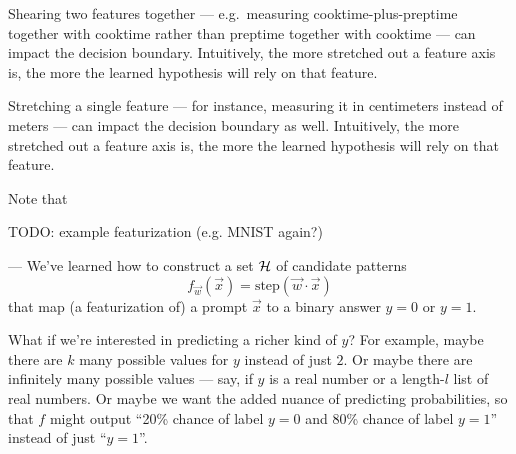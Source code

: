 \documentclass[11pt, justified]{tufte-book}
\newcommand{\attnsam}[1]{{\red \textsf{#1}}}
\newcommand{\samsubsubsection}[1]{
   \vspace{0.1cm}
   \par\noindent{\hspace{-2cm}\normalsize \sc \gre #1} ---
}
\newcommand{\sfx}{\mathsf{x}}\newcommand{\frx}{\mathcal{x}}
\newcommand{\sfy}{\mathsf{y}}\newcommand{\fry}{\mathcal{y}}
\theoremstyle{definition}
\begin{document}
        Shearing two features together --- e.g.\ measuring
        cooktime-plus-preptime together with cooktime rather than preptime
        together with cooktime --- can impact the decision boundary.
        Intuitively, the more stretched out a feature axis is, the more the
        learned hypothesis will rely on that feature.

        Stretching a single feature --- for instance, measuring it in
        centimeters instead of meters --- can impact the decision boundary
        as well.  Intuitively, the more stretched out a feature axis is, 
        the more the learned hypothesis will rely on that feature.

        Note that


        \attnsam{TODO: example featurization (e.g. MNIST again?)}


      \samsubsubsection{richer outputs}%
        We've learned how to construct a set $\mathcal{H}$ of candidate patterns 
        $$
          f_{\vec w}(\vec x) = \text{step}(\vec w\cdot \vec x) 
        $$
        that map (a featurization of) a prompt $\vec x$ to a binary answer $y=0$ or $y=1$.

        What if we're interested in predicting a richer kind of $y$?  For
        example, maybe there are $k$ many possible values for $y$ instead of
        just $2$.  Or maybe there are infinitely many possible values --- say,
        if $y$ is a real number or a length-$l$ list of real numbers.  Or maybe we want the added nuance of
        predicting probabilities, so that $f$ might output ``20\% chance of
        label $y=0$ and 80\% chance of label $y=1$'' instead of just ``$y=1$''.
\end{document}
